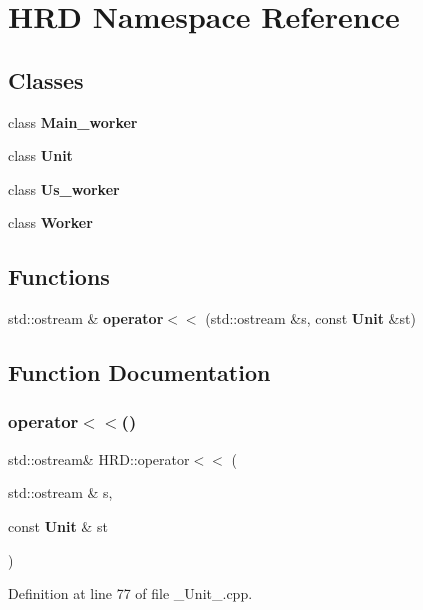 \section{H\+RD Namespace Reference}
\label{namespace_h_r_d}
\subsection*{Classes}
\begin{DoxyCompactItemize}
\item 
class \textbf{ Main\+\_\+worker}
\item 
class \textbf{ Unit}
\item 
class \textbf{ Us\+\_\+worker}
\item 
class \textbf{ Worker}
\end{DoxyCompactItemize}
\subsection*{Functions}
\begin{DoxyCompactItemize}
\item 
std\+::ostream \& \textbf{ operator$<$$<$} (std\+::ostream \&s, const \textbf{ Unit} \&st)
\end{DoxyCompactItemize}


\subsection{Function Documentation}
\mbox{\label{namespace_h_r_d_a018350b37eb43c0572045deb62311a9d}} 
\subsubsection{operator$<$$<$()}
{\footnotesize\ttfamily std\+::ostream\& H\+R\+D\+::operator$<$$<$ (\begin{DoxyParamCaption}\item[{std\+::ostream \&}]{s,  }\item[{const \textbf{ Unit} \&}]{st }\end{DoxyParamCaption})}



Definition at line 77 of file \+\_\+\+Unit\+\_\+.\+cpp.

